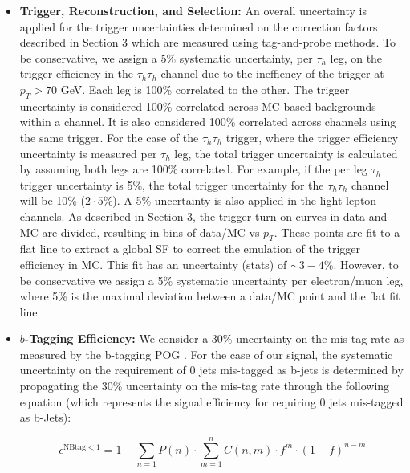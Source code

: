 \begin{itemize}
  \item \textbf{Trigger, Reconstruction, and Selection:} 
  An overall uncertainty is applied for the trigger uncertainties determined on the 
  correction factors described in Section 3 which are measured using tag-and-probe methods. 
  To be conservative, we assign a 5\% systematic uncertainty, per $\tau_{h}$ leg, on the trigger efficiency in the $\tau_{h}\tau_{h}$ channel due to the ineffiency of the trigger at $p_{T} > 70$ GeV. 
  Each leg is 100\% correlated to the other. The trigger uncertainty is considered 100\% correlated across MC based backgrounds within 
a channel. It is also considered 100\% correlated across channels using the same trigger. For the case of the $\tau_{h}\tau_{h}$ trigger, where the trigger 
efficiency uncertainty is measured per $\tau_{h}$ leg, the total trigger uncertainty is calculated by assuming both legs are 100\% correlated. For example, if the 
per leg $\tau_{h}$ trigger uncertainty is 5\%, the total trigger uncertainty for the $\tau_{h}\tau_{h}$ channel will be 10\% ($2\cdot 5$\%). A 5\% uncertainty is also applied 
in the light lepton channels. As described in Section 3, the trigger turn-on curves in data and MC are divided, resulting in bins of data/MC vs $p_{T}$. These points are 
fit to a flat line to extract a global SF to correct the emulation of the trigger efficiency in MC. This fit has an uncertainty (stats) of $\sim 3-4$\%. However, to be conservative we 
assign a 5\% systematic uncertainty per electron/muon leg, where 5\% is the maximal deviation between a data/MC point and the flat fit line. 

  \item \textbf{$b$-Tagging Efficiency:} We consider a 30\% uncertainty on the mis-tag rate as measured by the 
b-tagging POG \cite{CMS_PAS_BTV_11-001}. For the case of our signal, the systematic 
uncertainty on the requirement of 0 jets mis-tagged as b-jets is determined by propagating the 30\% uncertainty on the 
mis-tag rate through the following equation (which represents the signal efficiency for requiring 0 
jets mis-tagged as b-Jets):

\begin{equation}\label{eq:nttbar}
  \epsilon^{\textrm{NBtag} < 1} = 1 - \sum_{n=1} P(n) \cdot \sum_{m=1}^{n} C(n,m) \cdot f^{m} \cdot (1-f)^{n-m}
\end{equation}


\end{itemize}
